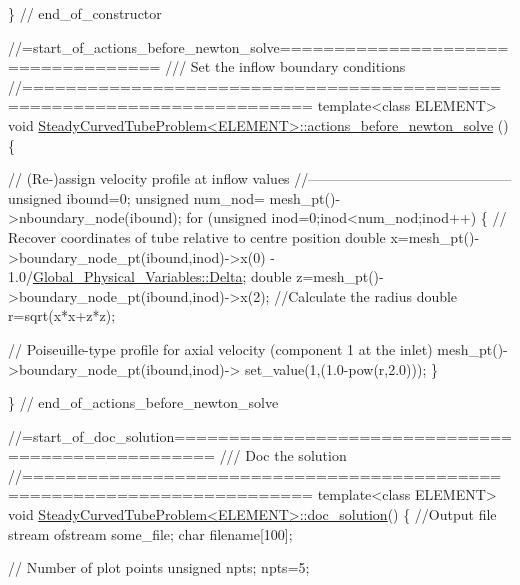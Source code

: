 \begin{DoxyCodeInclude}
\} \textcolor{comment}{// end\_of\_constructor}


\textcolor{comment}{//=start\_of\_actions\_before\_newton\_solve===================================}\textcolor{comment}{}
\textcolor{comment}{/// Set the inflow boundary conditions}
\textcolor{comment}{}\textcolor{comment}{//========================================================================}
\textcolor{keyword}{template}<\textcolor{keyword}{class} ELEMENT>
\textcolor{keywordtype}{void} \hyperlink{classSteadyCurvedTubeProblem_a90f3197b2cd58a6d24d7064018db3bac}{SteadyCurvedTubeProblem<ELEMENT>::actions\_before\_newton\_solve}
      ()
\{

 \textcolor{comment}{// (Re-)assign velocity profile at inflow values}
 \textcolor{comment}{//--------------------------------------------}
 \textcolor{keywordtype}{unsigned} ibound=0; 
 \textcolor{keywordtype}{unsigned} num\_nod= mesh\_pt()->nboundary\_node(ibound); 
 \textcolor{keywordflow}{for} (\textcolor{keywordtype}{unsigned} inod=0;inod<num\_nod;inod++)
  \{
   \textcolor{comment}{// Recover coordinates of tube relative to centre position}
   \textcolor{keywordtype}{double} x=mesh\_pt()->boundary\_node\_pt(ibound,inod)->x(0) - 
    1.0/\hyperlink{namespaceGlobal__Physical__Variables_add290b9e4a9c0e4c18a13faa7e29d857}{Global\_Physical\_Variables::Delta};
   \textcolor{keywordtype}{double} z=mesh\_pt()->boundary\_node\_pt(ibound,inod)->x(2);
   \textcolor{comment}{//Calculate the radius}
   \textcolor{keywordtype}{double} r=sqrt(x*x+z*z);  

   \textcolor{comment}{// Poiseuille-type profile for axial velocity (component 1 at the inlet)}
   mesh\_pt()->boundary\_node\_pt(ibound,inod)->
    set\_value(1,(1.0-pow(r,2.0)));
  \}

\} \textcolor{comment}{// end\_of\_actions\_before\_newton\_solve}


\textcolor{comment}{//=start\_of\_doc\_solution==================================================}\textcolor{comment}{}
\textcolor{comment}{/// Doc the solution}
\textcolor{comment}{}\textcolor{comment}{//========================================================================}
\textcolor{keyword}{template}<\textcolor{keyword}{class} ELEMENT>
\textcolor{keywordtype}{void} \hyperlink{classSteadyCurvedTubeProblem_a544bdf06e254393094a39561944af6b7}{SteadyCurvedTubeProblem<ELEMENT>::doc\_solution}()
\{ 
 \textcolor{comment}{//Output file stream}
 ofstream some\_file;
 \textcolor{keywordtype}{char} filename[100];

 \textcolor{comment}{// Number of plot points}
 \textcolor{keywordtype}{unsigned} npts;
 npts=5; 


\end{DoxyCodeInclude}
